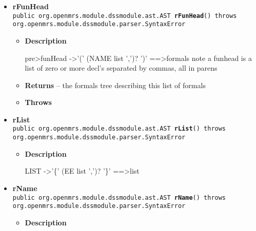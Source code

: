 {{{{{\begin{itemize}
{\begin{itemize}
{}
\item{{\bf  Returns} -- 
the tree corresponding to the factor expression 
}%
\item{{\bf  Throws}
}%
\end{itemize}
}%
\item{ 
\hypertarget{org.openmrs.module.dssmodule.parser.Parser.rFunHead()}{{\bf  rFunHead}\\}
\texttt{public org.openmrs.module.dssmodule.ast.AST\ {\bf  rFunHead}() throws org.openmrs.module.dssmodule.parser.SyntaxError
\label{org.openmrs.module.dssmodule.parser.Parser.rFunHead()}}%
\begin{itemize}
\item{
{\bf  Description}

pre\textgreater  funHead -\textgreater  '(' (NAME list ',')? ')' ==\textgreater  formals note a funhead is a list of zero or more decl's separated by commas, all in parens
}
\item{{\bf  Returns} -- 
the formals tree describing this list of formals 
}%
\item{{\bf  Throws}
}%
\end{itemize}
}%
\item{ 
\hypertarget{org.openmrs.module.dssmodule.parser.Parser.rList()}{{\bf  rList}\\}
\texttt{public org.openmrs.module.dssmodule.ast.AST\ {\bf  rList}() throws org.openmrs.module.dssmodule.parser.SyntaxError
\label{org.openmrs.module.dssmodule.parser.Parser.rList()}}%
\begin{itemize}
\item{
{\bf  Description}

LIST -\textgreater  '\{' (EE list ',')? '\}' ==\textgreater  list
}
\end{itemize}
}%
\item{ 
\hypertarget{org.openmrs.module.dssmodule.parser.Parser.rName()}{{\bf  rName}\\}
\texttt{public org.openmrs.module.dssmodule.ast.AST\ {\bf  rName}() throws org.openmrs.module.dssmodule.parser.SyntaxError
\label{org.openmrs.module.dssmodule.parser.Parser.rName()}}%
\begin{itemize}
\item{
{\bf  Description}

}
\end{itemize}}
\end{itemize}}}}}}
